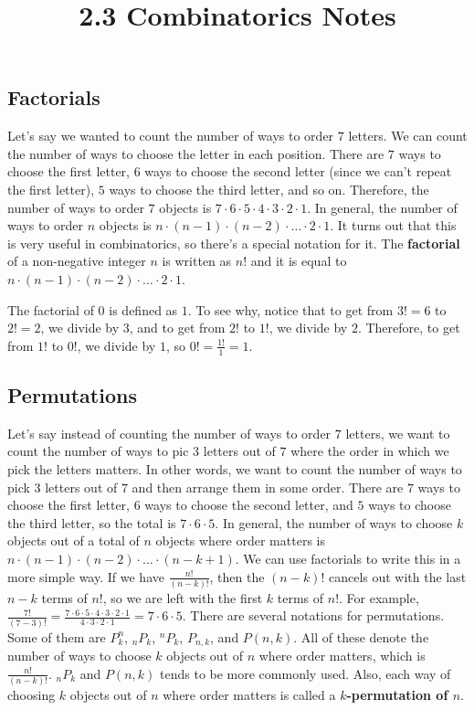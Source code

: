 \documentclass[twocolumn]{article}
\title{2.3 Combinatorics Notes}
\author{}
\date{}
\begin{document}
\maketitle

\subsection*{Factorials}
Let's say we wanted to count the number of ways to order $7$ letters.
We can count the number of ways to choose the letter in each position.
There are $7$ ways to choose the first letter, $6$ ways to choose the second letter (since we can't repeat the first letter), $5$ ways to choose the third letter, and so on.
Therefore, the number of ways to order $7$ objects is $7 \cdot 6 \cdot 5 \cdot 4 \cdot 3 \cdot 2 \cdot 1$.
In general, the number of ways to order $n$ objects is $n \cdot (n - 1) \cdot (n - 2) \cdot \dots \cdot 2 \cdot 1$.
It turns out that this is very useful in combinatorics, so there's a special notation for it.
The \textbf{factorial} of a non-negative integer $n$ is written as $n!$ and it is equal to $n \cdot (n - 1) \cdot (n - 2) \cdot \dots \cdot 2 \cdot 1$.

The factorial of $0$ is defined as $1$.
To see why, notice that to get from $3! = 6$ to $2! = 2$, we divide by $3$, and to get from $2!$ to $1!$, we divide by $2$.
Therefore, to get from $1!$ to $0!$, we divide by $1$, so $0! = \frac{1!}{1} = 1$.

\subsection*{Permutations}
Let's say instead of counting the number of ways to order $7$ letters, we want to count the number of ways to pic $3$ letters out of $7$ where the order in which we pick the letters matters.
In other words, we want to count the number of ways to pick $3$ letters out of $7$ and then arrange them in some order.
There are $7$ ways to choose the first letter, $6$ ways to choose the second letter, and $5$ ways to choose the third letter, so the total is $7 \cdot 6 \cdot 5$.
In general, the number of ways to choose $k$ objects out of a total of $n$ objects where order matters is $n \cdot (n - 1) \cdot (n - 2) \cdot \dots \cdot (n - k + 1)$.
We can use factorials to write this in a more simple way.
If we have $\frac{n!}{(n - k)!}$, then the $(n - k)!$ cancels out with the last $n - k$ terms of $n!$, so we are left with the first $k$ terms of $n!$.
For example, $\frac{7!}{(7 - 3)!} = \frac{7 \cdot 6 \cdot 5 \cdot 4 \cdot 3 \cdot 2 \cdot 1}{4 \cdot 3 \cdot 2 \cdot 1} = 7 \cdot 6 \cdot 5$.
There are several notations for permutations.
Some of them are $P^n_k$, $_nP_k$, $^nP_k$, $P_{n, k}$, and $P(n, k)$.
All of these denote the number of ways to choose $k$ objects out of $n$ where order matters, which is $\frac{n!}{(n - k)!}$.
$_nP_k$ and $P(n, k)$ tends to be more commonly used.
Also, each way of choosing $k$ objects out of $n$ where order matters is called a \textbf{$k$-permutation of $n$}.
\end{document}
